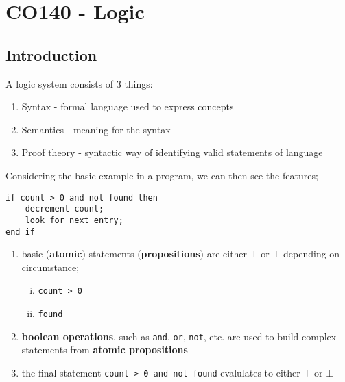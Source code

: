 \documentclass[a4paper, 12pt]{article}
\begin{document}
        \section*{CO140 - Logic}
        \subsection*{Introduction}
        A logic system consists of 3 things:
        \begin{enumerate}[1.]
            \item Syntax - formal language used to express concepts
            \item Semantics - meaning for the syntax
            \item Proof theory - syntactic way of identifying valid statements of language
        \end{enumerate}
        Considering the basic example in a program, we can then see the features;
        \begin{verbatim}
if count > 0 and not found then
    decrement count;
    look for next entry;
end if
        \end{verbatim}
        \begin{enumerate}[1.]
            \item basic (\textbf{atomic}) statements (\textbf{propositions}) are either $\top$ or $\bot$ depending on circumstance;
                \begin{enumerate}[i.]
                    \item \texttt{count > 0}
                    \item \texttt{found}
                \end{enumerate}
            \item \textbf{boolean operations}, such as \texttt{and}, \texttt{or}, \texttt{not}, etc. are used to build complex statements from \textbf{atomic propositions}
            \item the final statement \texttt{count > 0 and not found} evalulates to either $\top$ or $\bot$
        \end{enumerate}
\end{document}
